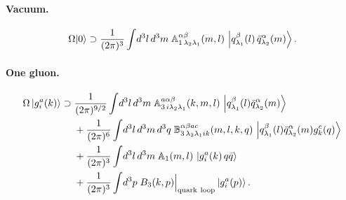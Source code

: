 \paragraph{Vacuum.}
\begin{equation}
\Omega|0\rangle\supset\frac{1}{(2\pi)^{3}}\int\!d^{3}l\,d^{3}m\;\mathbb{A}^{\alpha\beta}_{1\,\lambda_{2}\lambda_{1}}(m,l)\,
\left|q^{\beta}_{\lambda_{1}}(l)\,\bar q^{\alpha}_{\lambda_{2}}(m)\right\rangle .
\label{eq:Omvac}
\end{equation}

\paragraph{One gluon.}
\begin{align}
\OM\ket{\gl{a}{i}{k}}\supset\;&\frac{1}{(2\pi)^{9/2}}\int\!d^{3}l\,d^{3}m\;
\mf A^{a\alpha\beta}_{3\,i\lambda_{2}\lambda_{1}}(k,m,l)\,\ket{\qk{\beta}{\lambda_{1}}{l}\aqk{\alpha}{\lambda_{2}}{m}}
\nonumber\\
&+\frac{1}{(2\pi)^{6}}\int\!d^{3}l\,d^{3}m\,d^{3}q\;\mf B^{\alpha\beta ac}_{3\,\lambda_{2}\lambda_{1}ik}(m,l,k,q)\,
\ket{\qk{\beta}{\lambda_{1}}{l}\aqk{\alpha}{\lambda_{2}}{m}\gl{c}{k}{q}}
\nonumber\\
&+\frac{1}{(2\pi)^{3}}\int\!d^{3}l\,d^{3}m\;\mf A_{1}(m,l)\,\ket{\gl{a}{i}{k}\,q\bar q}
\nonumber\\
&+\frac{1}{(2\pi)^{3}}\int\!d^{3}p\;B_{3}(k,p)\Big|_{\rm quark\ loop}\ket{\gl{a}{i}{p}} .
\label{eq:Omg}
\end{align}

